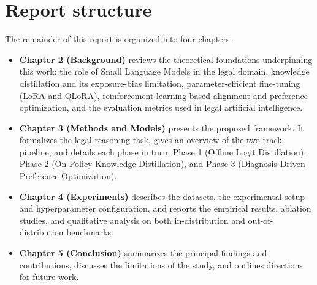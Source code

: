\section{Report structure}

The remainder of this report is organized into four chapters.

\begin{itemize}
    \item \textbf{Chapter 2 (Background)} reviews the theoretical foundations underpinning this work: the role of Small Language Models in the legal domain, knowledge distillation and its exposure-bias limitation, parameter-efficient fine-tuning (LoRA and QLoRA), reinforcement-learning-based alignment and preference optimization, and the evaluation metrics used in legal artificial intelligence.
    \item \textbf{Chapter 3 (Methods and Models)} presents the proposed framework. It formalizes the legal-reasoning task, gives an overview of the two-track pipeline, and details each phase in turn: Phase 1 (Offline Logit Distillation), Phase 2 (On-Policy Knowledge Distillation), and Phase 3 (Diagnosis-Driven Preference Optimization).
    \item \textbf{Chapter 4 (Experiments)} describes the datasets, the experimental setup and hyperparameter configuration, and reports the empirical results, ablation studies, and qualitative analysis on both in-distribution and out-of-distribution benchmarks.
    \item \textbf{Chapter 5 (Conclusion)} summarizes the principal findings and contributions, discusses the limitations of the study, and outlines directions for future work.
\end{itemize}

